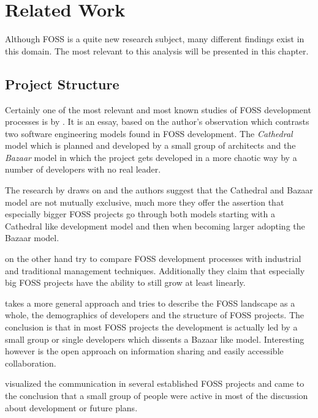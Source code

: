 \chapter{Related Work} %
\label{chap:related work}

Although \ac{FOSS} is a quite new research subject, many different findings
exist in this domain. The most relevant to this analysis will be presented in
this chapter.

\section{Project Structure} %

Certainly one of the most relevant and most known studies of \ac{FOSS}
development processes is  by \textcite{Raymond1998}. It
is an essay, based on the author's observation which contrasts two software
engineering models found in \ac{FOSS} development. The \emph{Cathedral} model
which is planned and developed by a small group of architects and the
\emph{Bazaar} model in which the project gets developed in a more chaotic way
by a number of developers with no real leader.

The research by \textcite{Capiluppi2007} draws on  and
the authors suggest that the Cathedral and Bazaar model are not mutually
exclusive, much more they offer the assertion that especially bigger \ac{FOSS}
projects go through both models starting with a Cathedral like development
model and then when becoming larger adopting the Bazaar model.

\textcite{Godfrey2000} on the other hand try to compare \ac{FOSS} development
processes with industrial and traditional management techniques. Additionally
they claim that especially big \ac{FOSS} projects have the ability to still grow
at least linearly.

\textcite{Kim2003} takes a more general approach and tries to describe the
\ac{FOSS} landscape as a whole, the demographics of developers and the
structure of \ac{FOSS} projects. The conclusion is that in most \ac{FOSS}
projects the development is actually led by a small group or single developers
which dissents a Bazaar like model. Interesting however is the open approach on
information sharing and easily accessible collaboration.

\textcite{Ogawa2007} visualized the communication in several established
\ac{FOSS} projects and came to the conclusion that a small group of people were
active in most of the discussion about development or future plans.


